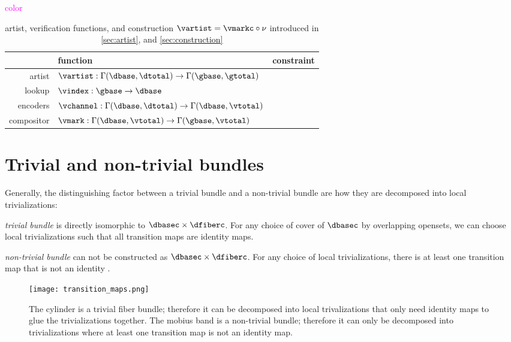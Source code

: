 \documentclass[journal]{IEEEtran}
\newcommand{\note}[1]{\textcolor{magenta}{#1}}
\theoremstyle{definition}
\theoremstyle{remark}
\begin{document}
\note{color}
\begin{table}[H]
  \centering
  {\renewcommand{\arraystretch}{1.2}
\begin{tabular}{|r|l|l|}
  \hline
      & function & constraint \\
  \hline
  \textcolor{artist}{artist} & $\vartist: \Gamma(\dbase, \dtotal) \rightarrow \Gamma(\gbase, \gtotal)$ &  \\
  \hline
  \textcolor{functor}{lookup} & $\vindex: \gbase\rightarrow \dbase$  &  \\
  \hline
  \textcolor{artist}{encoders} & $\vchannel: \Gamma(\dbase, \dtotal) \rightarrow \Gamma(\dbase, \vtotal) $  & \\
  \hline
  \textcolor{artist}{compositor} & $\vmark: \Gamma(\dbase,\vtotal) \rightarrow \Gamma(\gbase, \vtotal)$ &  \\
  \hline
\end{tabular}
\caption{artist, verification functions, and construction $\vartist = \vmarkc \circ \nu$ introduced in \autoref{sec:artist}, and \autoref{sec:construction}}
\label{tab:appendix:summary:artist}
}
\end{table}

\section{Trivial and non-trivial bundles}
\label{sec:appendix:bundle_triviality}

Generally, the distinguishing factor between a trivial bundle and a non-trivial bundle are how they are decomposed into local trivializations:
\begin{LaTeXdescription}
  \item[\textit{trivial bundle}] is directly isomorphic to $\dbasec\times\dfiberc$. For any choice of cover of $\dbasec$ by overlapping opensets, we can choose local trivializations such that all transition maps are identity maps.
  \item[\textit{non-trivial bundle}] can not be constructed as $\dbasec\times\dfiberc$. For any choice of local trivializations, there is at least one transition map that is not an identity \cite{hatcherAlgebraicTopology2002}.
\end{LaTeXdescription}


\begin{figure}[H]
  \texttt{[image: transition\_maps.png]}
  \caption{The cylinder is a trivial fiber bundle; therefore it can be decomposed into local trivalizations that only need identity
  maps to glue the trivializations together. The mobius band is a non-trivial bundle; therefore it can only be decomposed into trivializations where at least one transition map is not an identity map. }\label{fig:cyl_mob_bundles}
\end{figure}
\end{document}
